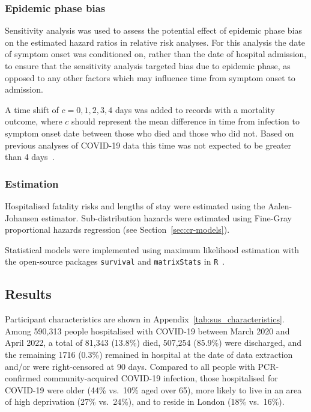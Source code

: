 \subsubsection{Epidemic phase bias}

Sensitivity analysis was used to assess the potential effect of epidemic phase bias on the estimated hazard ratios in relative risk analyses. For this analysis the date of symptom onset was conditioned on, rather than the date of hospital admission, to ensure that the sensitivity analysis targeted bias due to epidemic phase, as opposed to any other factors which may influence time from symptom onset to admission.

A time shift of $c = 0,1,2,3,4$ days was added to records with a mortality outcome, where $c$ should represent the mean difference in time from infection to symptom onset date between those who died and those who did not. Based on previous analyses of COVID-19 data this time was not expected to be greater than 4 days~\parencite{Seaman2022-tl}.

\subsubsection{Estimation}

Hospitalised fatality risks and lengths of stay were estimated using the Aalen-Johansen estimator. Sub-distribution hazards were estimated using Fine-Gray proportional hazards regression (see Section~\ref{sec:cr-models}).

Statistical models were implemented using maximum likelihood estimation with the open-source packages \texttt{survival} and \texttt{matrixStats} in \texttt{R}~\parencite{Therneau1999-to, Bengtsson2007-yb, R_Core_Team2020-ca}.

\subsection{Results}

Participant characteristics are shown in Appendix~\ref{tab:sus_characteristics}. Among 590,313 people hospitalised with COVID-19 between March 2020 and April 2022, a total of 81,343 (13.8\%) died, 507,254 (85.9\%) were discharged, and the remaining 1716 (0.3\%) remained in hospital at the date of data extraction and/or were right-censored at 90 days. Compared to all people with PCR-confirmed community-acquired COVID-19 infection, those hospitalised for COVID-19 were older (44\% vs.\ 10\% aged over 65), more likely to live in an area of high deprivation (27\% vs.\ 24\%), and to reside in London (18\% vs.\ 16\%).

